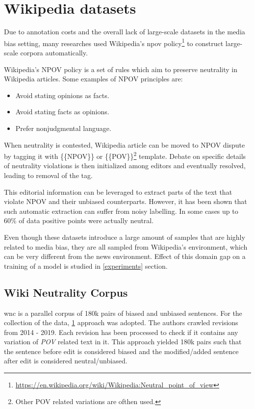 \section{Wikipedia datasets}\label{wiki-npov}
Due to annotation costs and the overall lack of large-scale datasets in the media bias setting, many researches \cite{pryzant2020automatically,recasens2013linguistic,hube2019neural} used Wikipedia's \Gls{npov} policy\footnote{\url{https://en.wikipedia.org/wiki/Wikipedia:Neutral_point_of_view}} to construct large-scale corpora automatically. 

Wikipedia's NPOV policy is a set of rules which aim to preserve neutrality in Wikipedia articles. Some examples of NPOV principles are:
\begin{itemize}
    \item Avoid stating opinions as facts.
    \item Avoid stating facts as opinions.
    \item Prefer nonjudgmental language.
\end{itemize}

When neutrality is contested, Wikipedia article can be moved to NPOV dispute by tagging it with \{\{NPOV\}\} or \{\{POV\}\}\footnote{Other POV related variations are ofthen used.} template. Debate on specific details of neutrality violations is then initialized among editors and eventually resolved, leading to removal of the tag.

This editorial information can be leveraged to extract parts of the text that violate NPOV and their unbiased counterparts. However, it has been shown \cite{hube2019neural,zhong-etal-2021-wikibias-detecting} that such automatic extraction can suffer from noisy labelling. In some cases \cite{hube2019neural} up to 60\% of data positive points were actually neutral.

Even though these datasets introduce a large amount of samples that are highly related to media bias, they are all sampled from Wikipedia's environment, which can be very different from the news environment. Effect of this domain gap on a training of a model is studied in \ref{experiments} section.




\subsection{Wiki Neutrality Corpus}\label{wiki}
\Gls{wnc} \cite{pryzant2020automatically} is a parallel corpus of 180k pairs of biased and unbiased sentences. For the collection of the data, \ref{wiki-npov} approach was adopted. The authors crawled revisions from 2014 - 2019. Each revision has been processed to check if it contains any variation of \textit{POV} related text in it. This approach yielded 180k pairs such that the sentence before edit is considered biased and the modified/added sentence after edit is considered neutral/unbiased.
    
